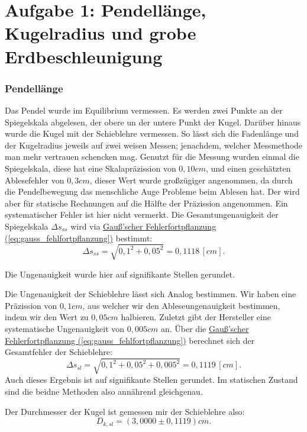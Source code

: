 \twocolumn

\section{Aufgabe 1: Pendellänge, Kugelradius und grobe Erdbeschleunigung}
\subsubsection*{Pendellänge}
Das Pendel wurde im Equilibrium vermessen. Es werden zwei Punkte an der Spiegelskala abgelesen, der obere un der untere Punkt der Kugel. Darüber hinaus wurde die Kugel mit der Schieblehre vermessen. So lässt sich die Fadenlänge und der Kugelradius jeweils auf zwei weisen Messen; jenachdem, welcher Messmethode man mehr vertrauen schencken mag.
Genutzt für die Messung wurden einmal die Spiegelskala, diese hat eine Skalapräzission von $0,10cm$, und einen geschätzten Ablesefehler von $0,3cm$, dieser Wert wurde großzügiger angenommen, da durch die Pendelbewegung das menschliche Auge Probleme beim Ablesen hat. Der wird aber für statische Rechnungen auf die Hälfte der Präzission angenommen. Ein systematischer Fehler ist hier nicht vermerkt. Die Gesamtungenauigkeit der Spiegelskala $\Delta s_{ss}$ wird via \hyperref[eq:gauss_fehlfortpflanzung]{Gauß'scher Fehlerfortpflanzung (\ref*{eq:gauss_fehlfortpflanzung})} bestimmt:
\begin{equation}
    \Delta s_{ss} = \sqrt{0,1^2+0,05^2} = 0,1118 \,[cm].
\end{equation}

Die Ungenauigkeit wurde hier auf signifikante Stellen gerundet.

Die Ungenauigkeit der Schieblehre lässt sich Analog bestimmen. Wir haben eine Präzission von $0,1cm$, aus welcher wir den Ableseungenauigkeit bestimmen, indem wir den Wert zu $0,05cm$ halbieren. Zuletzt gibt der Hersteller eine systematische Ungenauigkeit von $0,005cm$ an. Über die \hyperref[eq:gauss_fehlfortpflanzung]{Gauß'scher Fehlerfortpflanzung (\ref*{eq:gauss_fehlfortpflanzung})} berechnet sich der Gesamtfehler der Schieblehre:
\begin{equation}
    \Delta s_{sl} = \sqrt{0,1^2+0,05^2+0,005^2} = 0,1119 \, [cm].
\end{equation}
Auch dieses Ergebnis ist auf signifikante Stellen gerundet. Im statischen Zustand sind die beidne Methoden also annährend gleichgenau.

Der Durchmesser der Kugel ist gemessen mir der Schieblehre also:
\begin{equation}
    \boxed{
        D_{k,sl} = (3,0000 \pm 0,1119)cm.
    }
\end{equation}

